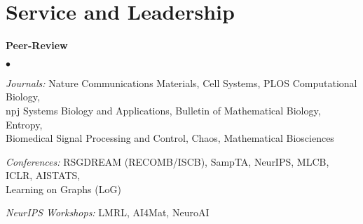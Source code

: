 \documentclass[margin,line]{res}
\newenvironment{list2}{
  \begin{list}{$\bullet$}{
      \setlength{\itemsep}{0in}
      \setlength{\parsep}{0in} \setlength{\parskip}{0in}
      \setlength{\topsep}{0in} \setlength{\partopsep}{0in}
      \setlength{\leftmargin}{0.2in}}}{\end{list}}
\begin{document}
\begin{resume}
{\begin{itemize}
\end{itemize}
}
\section{\sc Service and Leadership}

\textbf{Peer-Review}

\vspace*{.2cm}
\begin{list2}
\itemindent=-13pt
\setlength\itemsep{0.5em}
\item[] \textit{Journals:} \hspace*{1.42em} Nature Communications Materials, Cell Systems, PLOS Computational Biology, \\ 
\hspace*{4.7em} npj Systems Biology and Applications, Bulletin of Mathematical Biology, Entropy,\\
\hspace*{4.7em} Biomedical Signal Processing and Control, Chaos, Mathematical Biosciences
\item[] \textit{Conferences:} \hspace*{0.1em} RSGDREAM (RECOMB/ISCB), SampTA, NeurIPS, MLCB, ICLR, AISTATS, \\
\hspace*{5.0em} Learning on Graphs (LoG)
\item[] \textit{NeurIPS Workshops:} LMRL, AI4Mat, NeuroAI
\end{list2}


\end{resume}
\end{document}
